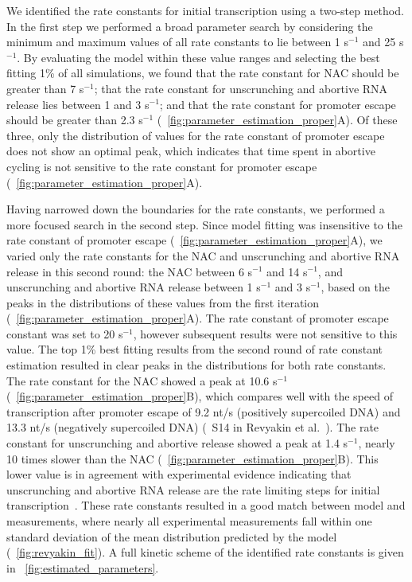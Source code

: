 %

We identified the rate constants for initial transcription using a two-step
method. In the first step we performed a broad parameter search by considering
the minimum and maximum values of all rate constants to lie between 1 s$^{-1}$
and 25 s$^{-1}$. By evaluating the model within these value ranges and
selecting the best fitting 1\% of all simulations, we found that the rate
constant for NAC should be greater than 7 s$^{-1}$; that the rate constant for
unscrunching and abortive RNA release lies between 1 and 3 s$^{-1}$; and that
the rate constant for promoter escape should be greater than 2.3 s$^{-1}$
(\FIG~\ref{fig:parameter_estimation_proper}A). Of these three, only the
distribution of values for the rate constant of promoter escape does not show
an optimal peak, which indicates that time spent in abortive cycling is not
sensitive to the rate constant for promoter escape
(\FIG~\ref{fig:parameter_estimation_proper}A).

Having narrowed down the boundaries for the rate constants, we performed a
more focused search in the second step. Since model fitting was insensitive to
the rate constant of promoter escape
(\FIG~\ref{fig:parameter_estimation_proper}A), we varied only the rate
constants for the NAC and unscrunching and abortive RNA release in this second
round: the NAC between 6 s$^{-1}$ and 14 s$^{-1}$, and unscrunching and
abortive RNA release between 1 s$^{-1}$ and 3 s$^{-1}$, based on the peaks in
the distributions of these values from the first iteration
(\FIG~\ref{fig:parameter_estimation_proper}A). The rate constant of promoter
escape constant was set to 20 s$^{-1}$, however subsequent results were not
sensitive to this value. The top 1\% best fitting results from the second
round of rate constant estimation resulted in clear peaks in the distributions
for both rate constants. The rate constant for the NAC showed a peak at 10.6
s$^{-1}$ (\FIG~\ref{fig:parameter_estimation_proper}B), which compares well
with the speed of transcription after promoter escape of 9.2 nt/s (positively
supercoiled DNA) and 13.3 nt/s (negatively supercoiled DNA) (\FIG~S14 in
Revyakin et al.\ \cite{revyakin_abortive_2006}). The rate constant for
unscrunching and abortive release showed a peak at 1.4 s$^{-1}$, nearly 10
times slower than the NAC (\FIG~\ref{fig:parameter_estimation_proper}B). This
lower value is in agreement with experimental evidence indicating that
unscrunching and abortive RNA release are the rate limiting steps for initial
transcription~\cite{revyakin_abortive_2006, margeat_direct_2006}. These rate
constants resulted in a good match between model and measurements, where
nearly all experimental measurements fall within one standard deviation of the
mean distribution predicted by the model (\FIG~\ref{fig:revyakin_fit}). A full
kinetic scheme of the identified rate constants is given in
\FIG~\ref{fig:estimated_parameters}.


